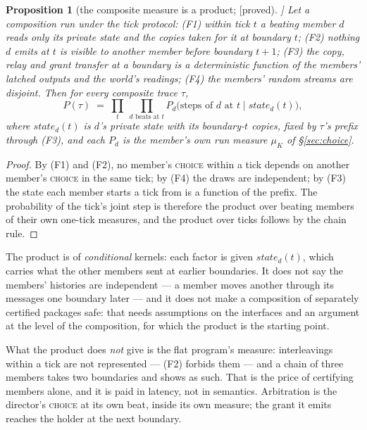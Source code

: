 \documentclass[11pt]{article}
\newcommand{\stproved}{[\textsf{proved}]}
\theoremstyle{plain}
\newtheorem{proposition}[theorem]{Proposition}
\theoremstyle{definition}
\theoremstyle{remark}
\begin{document}
\begin{proposition}[the composite measure is a product; \stproved{}]
\label{prop:composite}
Let a composition run under the tick protocol: (F1) within tick $t$ a
beating member $d$ reads only its private state and the copies taken for
it at boundary $t$; (F2) nothing $d$ emits at $t$ is visible to another
member before boundary $t{+}1$; (F3) the copy, relay and grant transfer
at a boundary is a deterministic function of the members' latched
outputs and the world's readings; (F4) the members' random streams are
disjoint. Then for every composite trace $\tau$,
\[
  P(\tau) \;=\; \prod_t \ \prod_{d \text{ beats at } t}
  P_d\big(\text{steps of } d \text{ at } t \;\big|\; \mathit{state}_d(t)\big),
\]
where $\mathit{state}_d(t)$ is $d$'s private state with its boundary-$t$
copies, fixed by $\tau$'s prefix through (F3), and each $P_d$ is the
member's own run measure $\mu_K$ of \S\ref{sec:choice}.
\end{proposition}

\begin{proof}
By (F1) and (F2), no member's \textsc{choice} within a tick depends on
another member's \textsc{choice} in the same tick; by (F4) the draws are
independent; by (F3) the state each member starts a tick from is a
function of the prefix. The probability of the tick's joint step is
therefore the product over beating members of their own one-tick
measures, and the product over ticks follows by the chain rule.
\end{proof}

The product is of \emph{conditional} kernels: each factor is given
$\mathit{state}_d(t)$, which carries what the other members sent at
earlier boundaries. It does not say the members' histories are
independent --- a member moves another through its messages one
boundary later --- and it does not make a composition of separately
certified packages safe: that needs assumptions on the interfaces and
an argument at the level of the composition, for which the product is
the starting point.

What the product does \emph{not} give is the flat program's measure:
interleavings within a tick are not represented --- (F2) forbids them
--- and a chain of three members takes two boundaries and shows as such.
That is the price of certifying members alone, and it is paid in
latency, not in semantics. Arbitration is the director's
\textsc{choice} at its own beat, inside its own measure; the grant it
emits reaches the holder at the next boundary.
\end{document}
